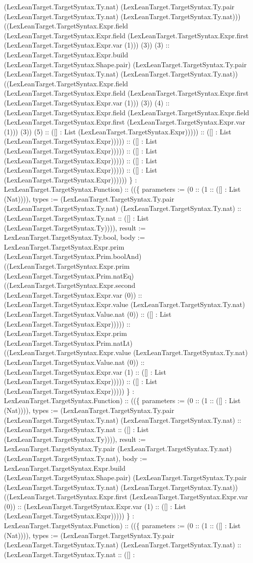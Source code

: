 \documentclass[11pt]{article}
\begin{document}
(LexLeanTarget.TargetSyntax.Ty.nat) (LexLeanTarget.TargetSyntax.Ty.pair (LexLeanTarget.TargetSyntax.Ty.nat) (LexLeanTarget.TargetSyntax.Ty.nat))) ((LexLeanTarget.TargetSyntax.Expr.field (LexLeanTarget.TargetSyntax.Expr.field (LexLeanTarget.TargetSyntax.Expr.first (LexLeanTarget.TargetSyntax.Expr.var (1))) (3)) (3) :: (LexLeanTarget.TargetSyntax.Expr.build (LexLeanTarget.TargetSyntax.Shape.pair) (LexLeanTarget.TargetSyntax.Ty.pair (LexLeanTarget.TargetSyntax.Ty.nat) (LexLeanTarget.TargetSyntax.Ty.nat)) ((LexLeanTarget.TargetSyntax.Expr.field (LexLeanTarget.TargetSyntax.Expr.field (LexLeanTarget.TargetSyntax.Expr.first (LexLeanTarget.TargetSyntax.Expr.var (1))) (3)) (4) :: (LexLeanTarget.TargetSyntax.Expr.field (LexLeanTarget.TargetSyntax.Expr.field (LexLeanTarget.TargetSyntax.Expr.first (LexLeanTarget.TargetSyntax.Expr.var (1))) (3)) (5) :: ([] : List (LexLeanTarget.TargetSyntax.Expr))))) :: ([] : List (LexLeanTarget.TargetSyntax.Expr))))) :: ([] : List (LexLeanTarget.TargetSyntax.Expr))))) :: ([] : List (LexLeanTarget.TargetSyntax.Expr))))) :: ([] : List (LexLeanTarget.TargetSyntax.Expr))))) :: ([] : List (LexLeanTarget.TargetSyntax.Expr)))))) \} : LexLeanTarget.TargetSyntax.Function) :: ((\{ parameters := (0 :: (1 :: ([] : List (Nat)))), types := (LexLeanTarget.TargetSyntax.Ty.pair (LexLeanTarget.TargetSyntax.Ty.nat) (LexLeanTarget.TargetSyntax.Ty.nat) :: (LexLeanTarget.TargetSyntax.Ty.nat :: ([] : List (LexLeanTarget.TargetSyntax.Ty)))), result := LexLeanTarget.TargetSyntax.Ty.bool, body := LexLeanTarget.TargetSyntax.Expr.prim (LexLeanTarget.TargetSyntax.Prim.boolAnd) ((LexLeanTarget.TargetSyntax.Expr.prim (LexLeanTarget.TargetSyntax.Prim.natEq) ((LexLeanTarget.TargetSyntax.Expr.second (LexLeanTarget.TargetSyntax.Expr.var (0)) :: (LexLeanTarget.TargetSyntax.Expr.value (LexLeanTarget.TargetSyntax.Ty.nat) (LexLeanTarget.TargetSyntax.Value.nat (0)) :: ([] : List (LexLeanTarget.TargetSyntax.Expr))))) :: (LexLeanTarget.TargetSyntax.Expr.prim (LexLeanTarget.TargetSyntax.Prim.natLt) ((LexLeanTarget.TargetSyntax.Expr.value (LexLeanTarget.TargetSyntax.Ty.nat) (LexLeanTarget.TargetSyntax.Value.nat (0)) :: (LexLeanTarget.TargetSyntax.Expr.var (1) :: ([] : List (LexLeanTarget.TargetSyntax.Expr))))) :: ([] : List (LexLeanTarget.TargetSyntax.Expr))))) \} : LexLeanTarget.TargetSyntax.Function) :: ((\{ parameters := (0 :: (1 :: ([] : List (Nat)))), types := (LexLeanTarget.TargetSyntax.Ty.pair (LexLeanTarget.TargetSyntax.Ty.nat) (LexLeanTarget.TargetSyntax.Ty.nat) :: (LexLeanTarget.TargetSyntax.Ty.nat :: ([] : List (LexLeanTarget.TargetSyntax.Ty)))), result := LexLeanTarget.TargetSyntax.Ty.pair (LexLeanTarget.TargetSyntax.Ty.nat) (LexLeanTarget.TargetSyntax.Ty.nat), body := LexLeanTarget.TargetSyntax.Expr.build (LexLeanTarget.TargetSyntax.Shape.pair) (LexLeanTarget.TargetSyntax.Ty.pair (LexLeanTarget.TargetSyntax.Ty.nat) (LexLeanTarget.TargetSyntax.Ty.nat)) ((LexLeanTarget.TargetSyntax.Expr.first (LexLeanTarget.TargetSyntax.Expr.var (0)) :: (LexLeanTarget.TargetSyntax.Expr.var (1) :: ([] : List (LexLeanTarget.TargetSyntax.Expr))))) \} : LexLeanTarget.TargetSyntax.Function) :: ((\{ parameters := (0 :: (1 :: ([] : List (Nat)))), types := (LexLeanTarget.TargetSyntax.Ty.pair (LexLeanTarget.TargetSyntax.Ty.nat) (LexLeanTarget.TargetSyntax.Ty.nat) :: (LexLeanTarget.TargetSyntax.Ty.nat :: ([] : 
\end{document}
